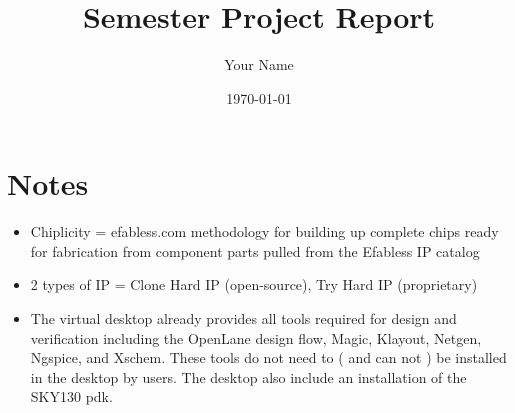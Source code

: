 \documentclass{report}
\begin{document}
\title{Semester Project Report}
\author{Your Name}
\date{\today}

\maketitle

\chapter*{Notes}
\begin{itemize}
    \item Chiplicity = efabless.com methodology for building up complete chips ready for fabrication from component parts pulled from the Efabless IP catalog
    \item 2 types of IP = Clone Hard IP (open-source), Try Hard IP (proprietary) 
    \item The virtual desktop already provides all tools required for design and verification including the OpenLane design flow, Magic, Klayout, Netgen, Ngspice, and Xschem.  These tools do not need to ( and can not ) be installed in the desktop by users.  The  desktop also include an installation of the SKY130 pdk.
\end{itemize}
\end{document}
